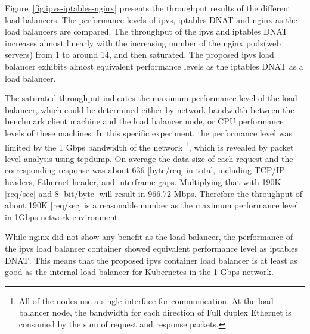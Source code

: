 
Figure~\ref{fig:ipvs-iptables-nginx} presents the throughput results of the different load balancers.
The performance levels of ipvs, iptables DNAT and nginx as the load balancers are compared.
The throughput of the ipvs and iptables DNAT increases almost linearly with the increasing number of the nginx pods(web servers) from 1 to around 14, and then saturated.
The proposed ipvs load balancer exhibits almost equivalent performance levels as the iptables DNAT as a load balancer.

The saturated throughput indicates the maximum performance level of the load balancer, which could be determined either by network bandwidth between the benchmark client machine and the load balancer node, or CPU performance levels of these machines.
%
In this specific experiment, the performance level was limited by the 1 Gbps bandwidth of the network
\footnote{
All of the nodes use a single interface for communication. 
At the load balancer node, the bandwidth for each direction of Full duplex Ethernet is consumed by the sum of request and response packets.
}, 
which is revealed by packet level analysis using tcpdump\cite{takahashi2018portable}.
%
On average the data size of each request and the corresponding response was about 636 [byte/req] in total, including TCP/IP headers, Ethernet header, and interframe gaps.
Multiplying that with 190K [req/sec] and 8 [bit/byte] will result in 966.72 Mbps.
Therefore the throughput of about 190K [req/sec] is a reasonable number as the maximum performance level in 1Gbps network environment.

While nginx did not show any benefit as the load balancer, the performance of the ipvs load balancer container showed equivalent performance level as iptables DNAT.
This means that the proposed ipvs container load balancer is at least as good as the internal load balancer for Kubernetes in the 1 Gbps network.

